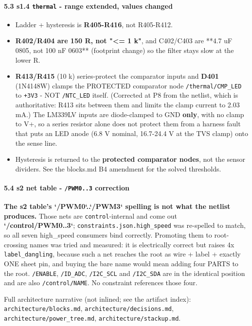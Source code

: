 \documentclass[11pt,a4paper]{article}
\begin{document}
\paragraph*{5.3 s1.4 \texttt{thermal} - range extended, values changed}
\begin{itemize}
\item Ladder + hysteresis is \textbf{R405-R416}, not R405-R412.
\item \textbf{R402/R404 are 150 R, not "\textless{}= 1 k"}, and C402/C403 are {*}{*}4.7 uF 0805, not
100 nF 0603{*}{*} (footprint change) so the filter stays slow at the lower R.
\item \textbf{R413/R415} (10 k) series-protect the comparator inputs and \textbf{D401}
(1N4148W) clamps the PROTECTED comparator node \texttt{/thermal/CMP\_LED} to
\texttt{+3V3} - NOT \texttt{/NTC\_LED} itself. (Corrected at P8 from the netlist, which is
authoritative: R413 sits between them and limits the clamp current to
2.03 mA.) The LM339LV inputs are diode-clamped
to GND \textbf{only}, with no clamp to V+, so a series resistor alone does not
protect them from a harness fault that puts an LED anode (6.8 V nominal,
16.7-24.4 V at the TVS clamp) onto the sense line.
\item Hysteresis is returned to the \textbf{protected comparator nodes}, not the sensor
dividers. See the blocks.md B4 amendment for the solved thresholds.
\end{itemize}
\paragraph*{5.4 s2 net table - \texttt{/PWM0..3} correction}
\textbf{The s2 table's `/PWM0`..`/PWM3` spelling is not what the netlist produces.} Those nets are \texttt{control}-internal and come out \textbf{`/control/PWM0..3`}; \texttt{constraints.json.high\_speed} was re-spelled to match, so all seven high\_speed consumers bind correctly. Promoting them to root-crossing names was tried and measured: it is electrically correct but raises 4x \texttt{label\_dangling}, because such a net reaches the root as wire + label + exactly ONE sheet pin, and buying the bare name would mean adding four PARTS to the root. \texttt{/ENABLE}, \texttt{/ID\_ADC}, \texttt{/I2C\_SCL} and \texttt{/I2C\_SDA} are in the identical position and are also \texttt{/control/NAME}. No constraint references those four.

Full architecture narrative (not inlined; see the artifact index): \texttt{architecture/blocks.md}, \texttt{architecture/decisions.md}, \texttt{architecture/power\_tree.md}, \texttt{architecture/stackup.md}.
\end{document}
